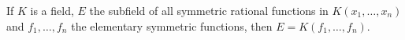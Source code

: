 If $K$ is a field, $E$ the subfield of all symmetric rational functions in $K(x_1, \ldots, x_n)$ and $f_1, \ldots, f_n$ the elementary symmetric functions, then $E = K(f_1, \ldots, f_n)$.
